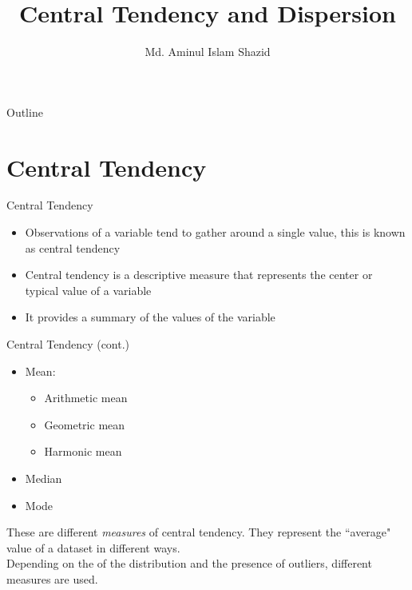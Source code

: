 \documentclass[12pt, aspectratio=169]{beamer}
\title{Central Tendency and Dispersion}
\author{Md. Aminul Islam Shazid}
\date{}
\begin{document}
    {
		\addtocounter{framenumber}{-2}    %

		\begin{frame}
			\titlepage
		\end{frame}

		\begin{frame}{Outline}
            \vfill
			\tableofcontents[subsectionstyle=hide]
            \vfill
		\end{frame}
	}

	\section{Central Tendency}

    \begin{frame}{Central Tendency}
        \begin{itemize}
            \item Observations of a variable tend to gather around a single value, this is known as central tendency
            \item Central tendency is a descriptive measure that represents the center or typical value of a variable
            \item It provides a summary of the values of the variable
        \end{itemize}
    \end{frame}


    \begin{frame}{Central Tendency (cont.)}
        \begin{itemize}
            \item Mean:
            \begin{itemize}
                \item Arithmetic mean
                \item Geometric mean
                \item Harmonic mean
            \end{itemize}
            \item Median
            \item Mode
        \end{itemize}
        These are different \textit{measures} of central tendency. They represent the ``average" value of a dataset in different ways.\\[0.25em]
        Depending on the  of the distribution and the presence of outliers, different measures are used.
    \end{frame}
\end{document}
